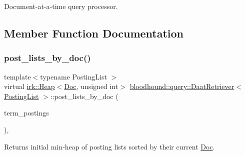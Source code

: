 Document-\/at-\/a-\/time query processor. 

\subsection{Member Function Documentation}
\mbox{\label{classbloodhound_1_1query_1_1DaatRetriever_a6c292b0ca9feb30dbdb3a2799a34b3e5}} 
\subsubsection{\texorpdfstring{post\+\_\+lists\+\_\+by\+\_\+doc()}{post\_lists\_by\_doc()}}
{\footnotesize\ttfamily template$<$typename Posting\+List $>$ \\
virtual \mbox{\hyperlink{classirk_1_1Heap}{irk\+::\+Heap}}$<$\mbox{\hyperlink{structbloodhound_1_1Doc}{Doc}}, unsigned int$>$ \mbox{\hyperlink{classbloodhound_1_1query_1_1DaatRetriever}{bloodhound\+::query\+::\+Daat\+Retriever}}$<$ \mbox{\hyperlink{classbloodhound_1_1PostingList}{Posting\+List}} $>$\+::post\+\_\+lists\+\_\+by\+\_\+doc (\begin{DoxyParamCaption}\item[{const std\+::vector$<$ \mbox{\hyperlink{classbloodhound_1_1PostingList}{Posting\+List}} $>$ \&}]{term\+\_\+postings }\end{DoxyParamCaption})\hspace{0.3cm}{\ttfamily [inline]}, {\ttfamily [virtual]}}



Returns initial min-\/heap of posting lists sorted by their current \mbox{\hyperlink{structbloodhound_1_1Doc}{Doc}}. 

\mbox{\label{classbloodhound_1_1query_1_1DaatRetriever_ab80b4867fc263827dc2fdbe0965a2e8c}} 
